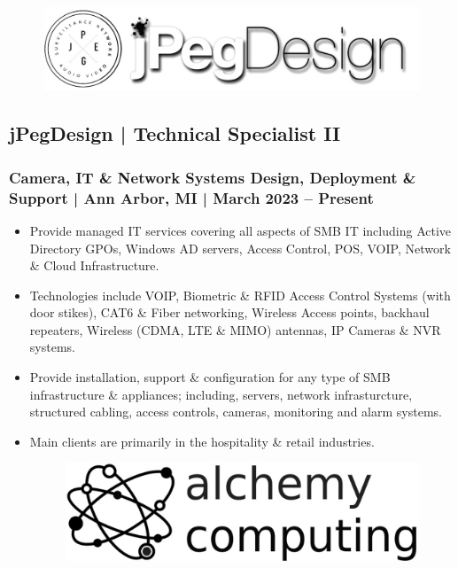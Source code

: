 \documentclass[letter,10pt]{article}
\begin{document}
\begin{figure}
\includegraphics[width=0.8\linewidth]{./img/jpeg_banner.jpg}
\end{figure}

\subsection*{jPegDesign | Technical Specialist II}
\label{sec:org0600441}
\subsubsection*{Camera, IT \& Network Systems Design, Deployment \& Support | Ann Arbor, MI | March 2023 – Present}
\label{sec:org2a9182a}
\begin{itemize}
\item Provide managed IT services covering all aspects of SMB IT including Active Directory GPOs, Windows AD servers, Access Control, POS, VOIP, Network \& Cloud Infrastructure.
\label{sec:org54370e5}
\item Technologies include VOIP, Biometric \& RFID Access Control Systems (with door stikes), CAT6 \& Fiber networking, Wireless Access points, backhaul repeaters, Wireless (CDMA, LTE \& MIMO) antennas, IP Cameras \& NVR systems.
\label{sec:orgdc59ddf}
\item Provide installation, support \& configuration for any type of SMB infrastructure \& appliances; including, servers, network infrasturcture, structured cabling, access controls, cameras, monitoring and alarm systems.
\label{sec:org046ebc3}
\item Main clients are primarily in the hospitality \& retail industries.
\label{sec:org379fa58}



\begin{figure}
\includegraphics[width=0.8\linewidth]{./img/50p_alchemy_computing.jpg}
\end{figure}
\end{itemize}
\end{document}
